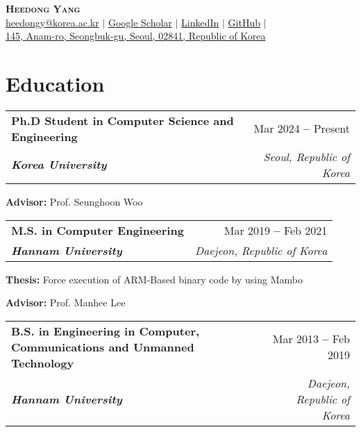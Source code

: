 \documentclass[letterpaper,11pt]{article}
\makeatletter
\newcommand{\resumeEducationHeading}[4]{
  \vspace{-2pt}\item
    \begin{tabular*}{0.97\textwidth}[t]{l@{\extracolsep{\fill}}r}
      \textbf{#1} & #2 \\
      \textit{\textbf{\small#3}} & \textit{\small #4} \\
    \end{tabular*}\vspace{-5pt}
}
\newcommand{\resumeSubHeadingListStart}{\begin{itemize}[leftmargin=0.2in]}
\newcommand{\resumeSubHeadingListEnd}{\end{itemize}}
\newcommand{\resumeSubHeadingItemListStart}{\begin{itemize}[label=-, leftmargin=0.15in]}
\newcommand{\resumeSubHeadingItemListEnd}{\end{itemize}\vspace{-5pt}}
\makeatother
\begin{document}

\begin{center}
    \textbf{\Huge \scshape Heedong Yang} \\ \vspace{7pt}
    \small
    \faEnvelope \hspace{.5pt} \href{mailto:heedongy@korea.ac.kr}{heedongy@korea.ac.kr}
    $|$
    \faGraduationCap \hspace{.5pt} \href{https://scholar.google.co.kr/citations?user=Gqegeu0AAAAJ}{Google Scholar}
    $|$
    \faLinkedinSquare \hspace{.5pt} \href{https://www.linkedin.com/in/heedongy}{LinkedIn}
    $|$
    \faGithub \hspace{.5pt} \href{https://github.com/heedongy}{GitHub}
    $|$ \\
    \faMapMarker \hspace{.5pt} \href{https://www.google.com/maps/place/고려대학교+우정정보관/data=!3m1!4b1!4m6!3m5!1s0x357cbcbaa67c853d:0x66a4f0cf5e431e8e!8m2!3d37.5851349!4d127.0284268!16s%2Fg%2F11hdc4yk8b?entry=ttu}{145, Anam-ro, Seongbuk-gu, Seoul, 02841, Republic of Korea}
\end{center}




\section{Education}
  \vspace{3pt}
  \resumeSubHeadingListStart
  \resumeEducationHeading
     {Ph.D Student in Computer Science and Engineering}  
     {Mar 2024 \textbf{--} Present}
     {Korea University}{Seoul, Republic of Korea}
        \resumeSubHeadingItemListStart
        \small{\item{\textbf{Advisor:} Prof. Seunghoon Woo}}
        \resumeSubHeadingItemListEnd
   \resumeEducationHeading
     {M.S. in Computer Engineering}   %
     {Mar 2019 \textbf{--} Feb 2021}
     {Hannam University}{Daejeon, Republic of Korea}
        \resumeSubHeadingItemListStart
        \small{\item{\textbf{Thesis:} Force execution of ARM-Based binary code by using Mambo}
        \item{\textbf{Advisor:} Prof. Manhee Lee}}
        \resumeSubHeadingItemListEnd
    \resumeEducationHeading
      {B.S. \small{in Engineering in Computer, Communications and Unmanned Technology}}
      {Mar 2013 \textbf{--} Feb 2019}
      {Hannam University}{Daejeon, Republic of Korea}
  \resumeSubHeadingListEnd
\end{document}
